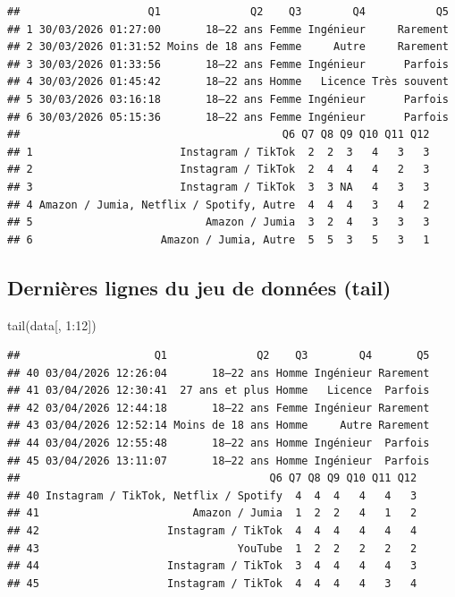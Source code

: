 \documentclass[
]{article}
\newenvironment{Shaded}{\begin{snugshade}}{\end{snugshade}}
\newcommand{\DecValTok}[1]{\textcolor[rgb]{0.00,0.00,0.81}{#1}}
\newcommand{\FunctionTok}[1]{\textcolor[rgb]{0.00,0.00,0.00}{#1}}
\newcommand{\NormalTok}[1]{#1}
\newcommand{\SpecialCharTok}[1]{\textcolor[rgb]{0.00,0.00,0.00}{#1}}
\begin{document}
\begin{verbatim}
##                    Q1              Q2    Q3        Q4           Q5
## 1 30/03/2026 01:27:00       18–22 ans Femme Ingénieur     Rarement
## 2 30/03/2026 01:31:52 Moins de 18 ans Femme     Autre     Rarement
## 3 30/03/2026 01:33:56       18–22 ans Femme Ingénieur      Parfois
## 4 30/03/2026 01:45:42       18–22 ans Homme   Licence Très souvent
## 5 30/03/2026 03:16:18       18–22 ans Femme Ingénieur      Parfois
## 6 30/03/2026 05:15:36       18–22 ans Femme Ingénieur      Parfois
##                                         Q6 Q7 Q8 Q9 Q10 Q11 Q12
## 1                       Instagram / TikTok  2  2  3   4   3   3
## 2                       Instagram / TikTok  2  4  4   4   2   3
## 3                       Instagram / TikTok  3  3 NA   4   3   3
## 4 Amazon / Jumia, Netflix / Spotify, Autre  4  4  4   3   4   2
## 5                           Amazon / Jumia  3  2  4   3   3   3
## 6                    Amazon / Jumia, Autre  5  5  3   5   3   1
\end{verbatim}

\hypertarget{derniuxe8res-lignes-du-jeu-de-donnuxe9es-tail}{%
\subsection{Dernières lignes du jeu de données
(tail)}\label{derniuxe8res-lignes-du-jeu-de-donnuxe9es-tail}}

\begin{Shaded}
\begin{Highlighting}[]
\FunctionTok{tail}\NormalTok{(data[, }\DecValTok{1}\SpecialCharTok{:}\DecValTok{12}\NormalTok{])}
\end{Highlighting}
\end{Shaded}

\begin{verbatim}
##                     Q1              Q2    Q3        Q4       Q5
## 40 03/04/2026 12:26:04       18–22 ans Homme Ingénieur Rarement
## 41 03/04/2026 12:30:41  27 ans et plus Homme   Licence  Parfois
## 42 03/04/2026 12:44:18       18–22 ans Femme Ingénieur Rarement
## 43 03/04/2026 12:52:14 Moins de 18 ans Homme     Autre Rarement
## 44 03/04/2026 12:55:48       18–22 ans Homme Ingénieur  Parfois
## 45 03/04/2026 13:11:07       18–22 ans Homme Ingénieur  Parfois
##                                       Q6 Q7 Q8 Q9 Q10 Q11 Q12
## 40 Instagram / TikTok, Netflix / Spotify  4  4  4   4   4   3
## 41                        Amazon / Jumia  1  2  2   4   1   2
## 42                    Instagram / TikTok  4  4  4   4   4   4
## 43                               YouTube  1  2  2   2   2   2
## 44                    Instagram / TikTok  3  4  4   4   4   3
## 45                    Instagram / TikTok  4  4  4   4   3   4
\end{verbatim}
\end{document}

